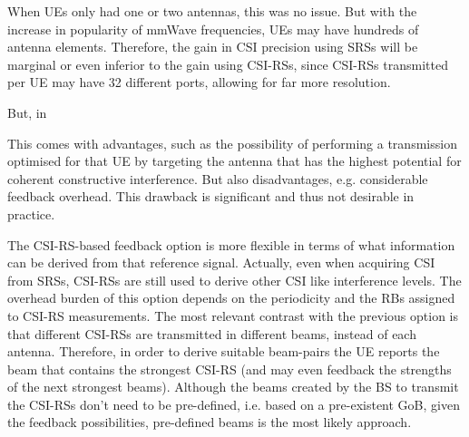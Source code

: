 When UEs only had one or two antennas, this was no issue. But with the increase in popularity of mmWave frequencies, UEs may have hundreds of antenna elements. Therefore, the gain in CSI precision using SRSs will be marginal or even inferior to the gain using CSI-RSs, since CSI-RSs transmitted per UE may have 32 different ports, allowing for far more resolution. 

But, in 





This comes with advantages, such as the possibility of performing a transmission optimised for that UE by targeting the antenna that has the highest potential for coherent constructive interference. But also disadvantages, e.g. considerable feedback overhead. This drawback is significant and thus not desirable in practice.



The CSI-RS-based feedback option is more flexible in terms of what information can be derived from that reference signal. Actually, even when acquiring CSI from SRSs, CSI-RSs are still used to derive other CSI like interference levels. The overhead burden of this option depends on the periodicity and the \acp{RB} assigned to CSI-RS measurements. The most relevant contrast with the previous option is that different CSI-RSs are transmitted in different beams, instead of each antenna. Therefore, in order to derive suitable beam-pairs the UE reports the beam that contains the strongest CSI-RS (and may even feedback the strengths of the next strongest beams). Although the beams created by the BS to transmit the CSI-RSs don't need to be pre-defined, i.e. based on a pre-existent GoB, given the feedback possibilities, pre-defined beams is the most likely approach.


